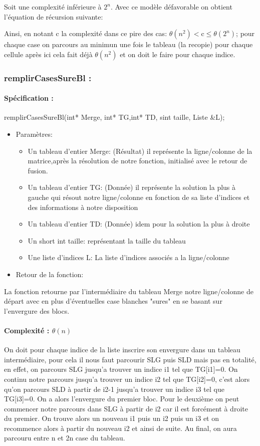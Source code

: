 \documentclass{article}
\begin{document}
Soit une complexité inférieure à $2^n$.
\newline
Avec ce modèle défavorable on obtient l'équation de récursion suivante:
\begin{center}
\end{center}
Ainsi, en notant c la complexité dans ce pire des cas: $\theta(n^2) <$c$\leq\theta(2^n)$; pour chaque case on parcours au minimun une fois le tableau (la recopie) pour chaque cellule après ici cela fait déjà $\theta(n^2)$ et on doit le faire pour chaque indice.
\subsubsection{remplirCasesSureBl :}
\paragraph{Spécification :}remplirCasesSureBl(int* Merge, int* TG,int* TD, sint taille, Liste \&L);
\begin{itemize}
\item Paramètres:
\begin{itemize}
\item Un tableau d'entier Merge: (Résultat) il représente la ligne/colonne de la matrice,après la résolution de notre fonction, initialisé avec le retour de fusion.
\item Un tableau d'entier TG: (Donnée) il représente la solution la plus à gauche qui résout notre ligne/colonne en fonction de sa liste d'indices et des informations à notre disposition
\item Un tableau d'entier TD: (Donnée) idem pour la solution la plus à droite
\item Un short int taille: représentant la taille du tableau
\item Une liste d'indices L: La liste d'indices associés a la ligne/colonne
\end{itemize}
\item Retour de la fonction:
\end{itemize}
La fonction retourne par l'intermédiaire du tableau Merge notre ligne/colonne de départ avec en plus d'éventuelles case blanches "sures" en se basant sur l'envergure des blocs.
\paragraph{Complexité : $\theta(n)$\newline}
On doit pour chaque indice de la liste inscrire son envergure dans un tableau intermédiaire, pour cela il nous faut parcourir SLG puis SLD mais pas en totalité, en effet, on parcours SLG jusqu'a trouver un indice i1 tel que TG[i1]=0.
On continu notre parcours jusqu'a trouver un indice i2 tel que TG[i2]=0, c'est alors qu'on parcours SLD à partir de i2-1 jusqu'a trouver un indice i3 tel que TG[i3]=0. 
On a alors l'envergure du premier bloc. Pour le deuxième on peut commencer notre parcours dans SLG à partir de i2 car il est forcément à droite du premier.\newline 
On trouve alors un nouveau i1 puis un i2 puis un i3 et on recommence alors à partir du nouveau i2 et ainsi de suite. Au final, on aura parcouru entre n et 2n case du tableau.
\end{document}
